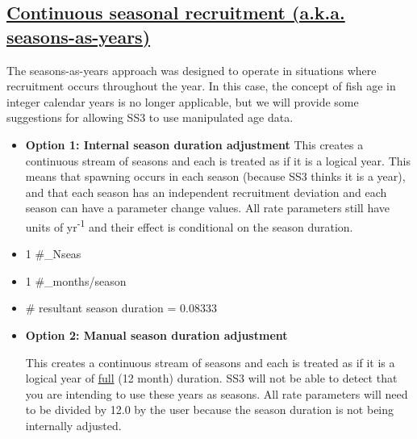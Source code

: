 \subsection[Continuous seasonal recruitment (a.k.a. seasons-as-years)]{\protect\hyperlink{continuous-seasonal-recruitment-sec}{Continuous seasonal recruitment (a.k.a. seasons-as-years)}}
The seasons-as-years approach was designed to operate in situations where recruitment occurs throughout the year. In this case, the concept of fish age in integer calendar years is no longer applicable, but we will provide some suggestions for allowing SS3 to use manipulated age data.
\begin{itemize}
	\item \textbf{Option 1: Internal season duration adjustment}
	 This creates a continuous stream of seasons and each is treated as if it is a logical year. This means that spawning occurs in each season (because SS3 thinks it is a year), and that each season has an independent recruitment deviation and each season can have a parameter change values. All rate parameters still have units of yr\textsuperscript{-1} and their effect is conditional on the season duration.
		\item 1 \#\_Nseas
		\item 1 \#\_months/season
		\item \# resultant season duration = 0.08333
	\item \hypertarget{option2}{\textbf{Option 2: Manual season duration adjustment}}
	This creates a continuous stream of seasons and each is treated as if it is a logical year of \underline{full} (12 month) duration. SS3 will not be able to detect that you are intending to use these years as seasons. All rate parameters will need to be divided by 12.0 by the user because the season duration is not being internally adjusted.

\end{itemize}
